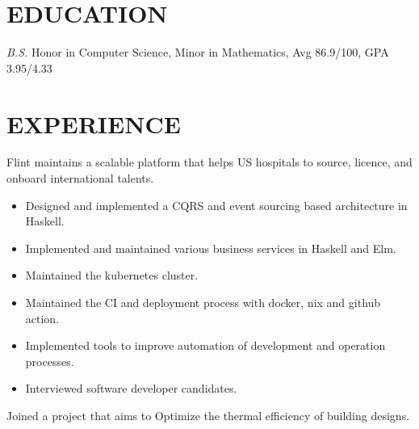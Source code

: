 \documentclass{resume}
\begin{document}


\section{EDUCATION}
\textit{B.S.} Honor in Computer Science, Minor in Mathematics, Avg 86.9/100, GPA 3.95/4.33

\section{EXPERIENCE}
    Flint maintains a scalable platform that helps US hospitals to source, licence, and onboard international talents.

    \begin{itemize}
        \item Designed and implemented a CQRS and event sourcing based architecture in Haskell.

        \item Implemented and maintained various business services in Haskell and Elm. 

        \item Maintained the kubernetes cluster.

        \item Maintained the CI and deployment process with docker, nix and github action.

        \item Implemented tools to improve automation of development and operation processes. 

        \item Interviewed software developer candidates.
    \end{itemize}

     \vspace{-0.1in}

    Joined a project that aims to Optimize the thermal efficiency of building designs.
\end{document}
